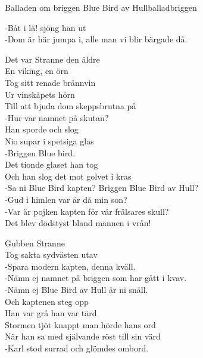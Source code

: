 \begin{song}{Balladen om briggen Blue Bird av Hull}{balladbriggen}
\begin{vers}
-Båt i lä! sjöng han ut\\
-Dom är här jumpa i, alle man vi blir bärgade då.\\
\end{vers}
\begin{vers}
Det var Stranne den äldre\\
En viking, en örn\\
Tog sitt renade brännvin\\
Ur vinskåpets hörn\\
Till att bjuda dom skeppsbrutna på\\
-Hur var namnet på skutan?\\
Han sporde och slog\\
Nio supar i spetsiga glas\\
-Briggen Blue bird.\\
Det tionde glaset han tog\\
Och han slog det mot golvet i kras\\
-Sa ni Blue Bird kapten? Briggen Blue Bird av Hull?\\
-Gud i himlen var är då min son?\\
-Var är pojken kapten för vår frälsares skull?\\
Det blev dödstyst bland männen i vrån!\\
\end{vers}
\begin{vers}
Gubben Stranne\\
Tog sakta sydvästen utav\\
-Spara modern kapten, denna kväll.\\
-Nämn ej namnet på briggen som har gått i kvav.\\
-Nämn ej Blue Bird av Hull är ni snäll.\\
Och kaptenen steg opp\\
Han var grå han var tärd\\
Stormen tjöt knappt man hörde hans ord\\
När han sa med självande röst till sin värd\\
-Karl stod surrad och glömdes ombord.\\
\end{vers}
\end{song}


